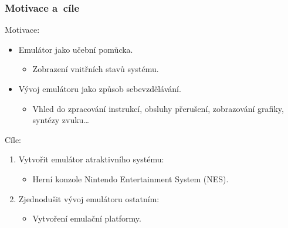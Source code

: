 \documentclass{beamer}
\begin{document}
\begin{frame}
	\frametitle{Motivace a~cíle}
	Motivace:
	\begin{itemize}
		\item Emulátor jako učební pomůcka.
		\begin{itemize}
			\item Zobrazení vnitřních stavů systému.
		\end{itemize}
		\item Vývoj emulátoru jako způsob sebevzdělávání.
		\begin{itemize}
			\item Vhled do zpracování instrukcí, obsluhy přerušení, zobrazování grafiky, syntézy zvuku\dots
		\end{itemize}
	\end{itemize}
	\pause
	Cíle:
	\begin{enumerate}
		\item Vytvořit emulátor atraktivního systému:
		\begin{itemize}
			\item Herní konzole Nintendo Entertainment System (NES).
		\end{itemize}
		\item Zjednodušit vývoj emulátoru ostatním:
		\begin{itemize}
			\item Vytvoření emulační platformy.
		\end{itemize}
	\end{enumerate}
\end{frame}

\end{document}

